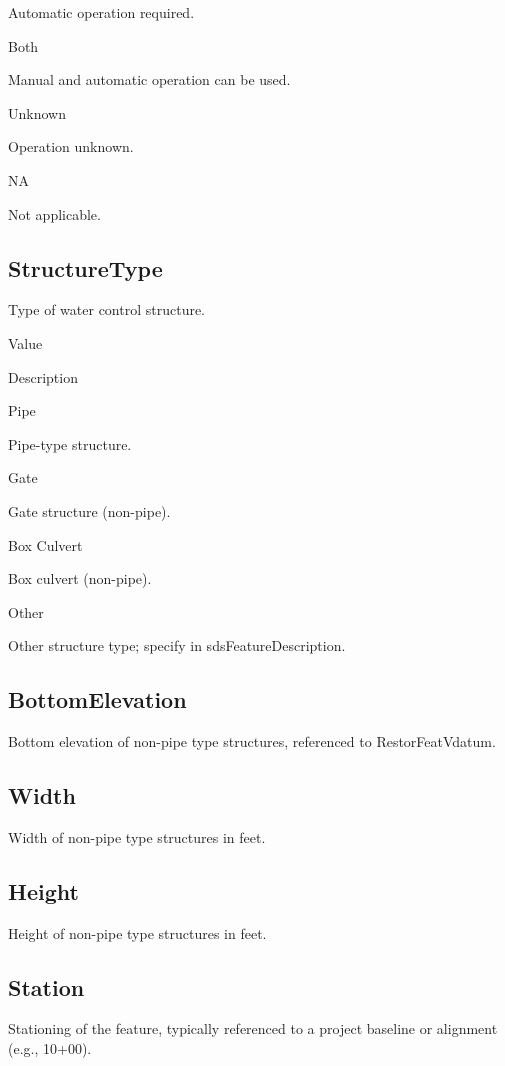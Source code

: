 \documentclass[
  letterpaper,
  DIV=11,
  numbers=noendperiod]{scrreprt}
\begin{document}
Automatic operation required.

Both

Manual and automatic operation can be used.

Unknown

Operation unknown.

NA

Not applicable.

\subsection{StructureType}\label{structuretype}

Type of water control structure.

Value

Description

Pipe

Pipe-type structure.

Gate

Gate structure (non-pipe).

Box Culvert

Box culvert (non-pipe).

Other

Other structure type; specify in sdsFeatureDescription.

\subsection{BottomElevation}\label{bottomelevation}

Bottom elevation of non-pipe type structures, referenced to
RestorFeatVdatum.

\subsection{Width}\label{width}

Width of non-pipe type structures in feet.

\subsection{Height}\label{height}

Height of non-pipe type structures in feet.

\subsection{Station}\label{station-3}

Stationing of the feature, typically referenced to a project baseline or
alignment (e.g., 10+00).
\end{document}
